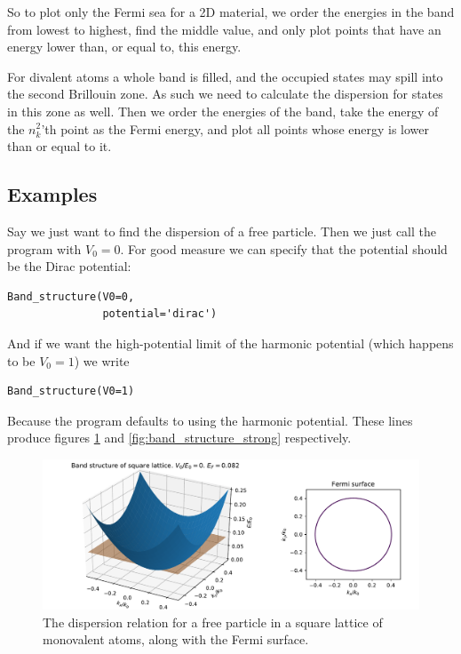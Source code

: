 \documentclass[main.tex]{subfiles}
\begin{document}
	So to plot only the Fermi sea for a 2D material, we order the energies in the band from lowest to highest, find the middle value, and only plot points that have an energy lower than, or equal to, this energy.
	
	For divalent atoms a whole band is filled, and the occupied states may spill into the second Brillouin zone. As such we need to calculate the dispersion for states in this zone as well. Then we order the energies of the band, take the energy of the $ n_k^2 $'th point as the Fermi energy, and plot all points whose energy is lower than or equal to it.
	
	\subsection{Examples}
	Say we just want to find the dispersion of a free particle. Then we just call the program with $ V_0 = 0 $. For good measure we can specify that the potential should be the Dirac potential:
\begin{lstlisting}
Band_structure(V0=0,
			   potential='dirac')
\end{lstlisting}
	And if we want the high-potential limit of the harmonic potential (which happens to be $ V_0 = 1 $) we write
\begin{lstlisting}
Band_structure(V0=1)
\end{lstlisting}
	Because the program defaults to using the harmonic potential. These lines produce figures \ref{fig:band_structure_none} and \ref{fig:band_structure_strong} respectively.
	\begin{figure}[h]
		\centering
		\includegraphics[width=\linewidth]{figures/band_structure_none.pdf}
		\caption{The dispersion relation for a free particle in a square lattice of monovalent atoms, along with the Fermi surface.}
		\label{fig:band_structure_none}
	\end{figure}
\end{document}
